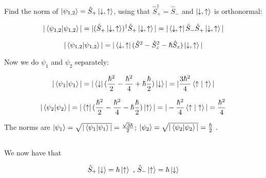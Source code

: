 \documentclass[11pt]{article}
\begin{document}
\begin{flushleft}
Find the norm of $\ket{\psi_{1,2}} = \hat{S}_+ \ket{\downarrow,\uparrow}$, using that $\hat{S}_+^{\dagger} = \hat{S}_-$ and $\ket{\downarrow,\uparrow}$ is orthonormal: 

$$
|\braket{\psi_{1,2}|\psi_{1,2}}| = |(\hat{S}_+ \ket{\downarrow,\uparrow})^{\dagger} \hat{S}_+ \ket{\downarrow, \uparrow}| = |\bra{\downarrow, \uparrow} \hat{S}_- \hat{S}_+ \ket{\downarrow, \uparrow}|
$$

$$
|\braket{\psi_{1,2}|\psi_{1,2}}| = |\bra{\downarrow, \uparrow} (\hat{S}^2 - \hat{S}_z^2 - \hbar \hat{S}_z) \ket{\downarrow, \uparrow}|
$$

Now we do $\psi_1$ and $\psi_2$ separately: 


$$
|\braket{\psi_1|\psi_1}|= |\bra{\downarrow} (\frac{\hbar^2}{2} - \frac{\hbar^2}{4} + \hbar \frac{\hbar}{2}) \ket{\downarrow}| = |\frac{3\hbar^2}{4} \braket{\uparrow|\uparrow}|
$$

$$
|\braket{\psi_2|\psi_2}|= |\bra{\uparrow} (\frac{\hbar^2}{2} - \frac{\hbar^2}{4} - \hbar \frac{\hbar}{2}) \ket{\uparrow}| = |-\frac{\hbar^2}{4} \braket{\uparrow|\uparrow}| = \frac{\hbar^2}{4}
$$

The norms are $\ket{\psi_1} = \sqrt{|\braket{\psi_1|\psi_1}|} = \frac{\sqrt{3} \hbar}{2}$; $\ket{\psi_2} = \sqrt{|\braket{\psi_2|\psi_2}|} = \frac{ \hbar}{2}$ .
\end{flushleft}

\subsection{}

\begin{flushleft}
We now have that

\begin{equation}
\hat{S}_+ \ket{\downarrow} = \hbar \ket{\uparrow} \text{ , } \hat{S}_- \ket{\uparrow} = \hbar \ket{\downarrow}
\end{equation}
\end{flushleft}
\end{document}
